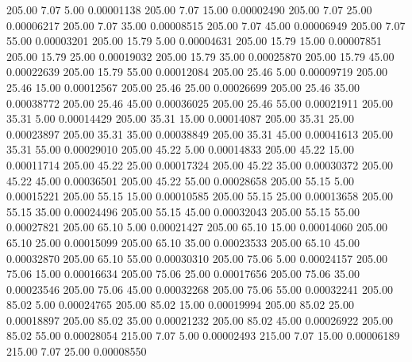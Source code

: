    205.00      7.07      5.00     0.00001138
    205.00      7.07     15.00     0.00002490
    205.00      7.07     25.00     0.00006217
    205.00      7.07     35.00     0.00008515
    205.00      7.07     45.00     0.00006949
    205.00      7.07     55.00     0.00003201
    205.00     15.79      5.00     0.00004631
    205.00     15.79     15.00     0.00007851
    205.00     15.79     25.00     0.00019032
    205.00     15.79     35.00     0.00025870
    205.00     15.79     45.00     0.00022639
    205.00     15.79     55.00     0.00012084
    205.00     25.46      5.00     0.00009719
    205.00     25.46     15.00     0.00012567
    205.00     25.46     25.00     0.00026699
    205.00     25.46     35.00     0.00038772
    205.00     25.46     45.00     0.00036025
    205.00     25.46     55.00     0.00021911
    205.00     35.31      5.00     0.00014429
    205.00     35.31     15.00     0.00014087
    205.00     35.31     25.00     0.00023897
    205.00     35.31     35.00     0.00038849
    205.00     35.31     45.00     0.00041613
    205.00     35.31     55.00     0.00029010
    205.00     45.22      5.00     0.00014833
    205.00     45.22     15.00     0.00011714
    205.00     45.22     25.00     0.00017324
    205.00     45.22     35.00     0.00030372
    205.00     45.22     45.00     0.00036501
    205.00     45.22     55.00     0.00028658
    205.00     55.15      5.00     0.00015221
    205.00     55.15     15.00     0.00010585
    205.00     55.15     25.00     0.00013658
    205.00     55.15     35.00     0.00024496
    205.00     55.15     45.00     0.00032043
    205.00     55.15     55.00     0.00027821
    205.00     65.10      5.00     0.00021427
    205.00     65.10     15.00     0.00014060
    205.00     65.10     25.00     0.00015099
    205.00     65.10     35.00     0.00023533
    205.00     65.10     45.00     0.00032870
    205.00     65.10     55.00     0.00030310
    205.00     75.06      5.00     0.00024157
    205.00     75.06     15.00     0.00016634
    205.00     75.06     25.00     0.00017656
    205.00     75.06     35.00     0.00023546
    205.00     75.06     45.00     0.00032268
    205.00     75.06     55.00     0.00032241
    205.00     85.02      5.00     0.00024765
    205.00     85.02     15.00     0.00019994
    205.00     85.02     25.00     0.00018897
    205.00     85.02     35.00     0.00021232
    205.00     85.02     45.00     0.00026922
    205.00     85.02     55.00     0.00028054
    215.00      7.07      5.00     0.00002493
    215.00      7.07     15.00     0.00006189
    215.00      7.07     25.00     0.00008550
